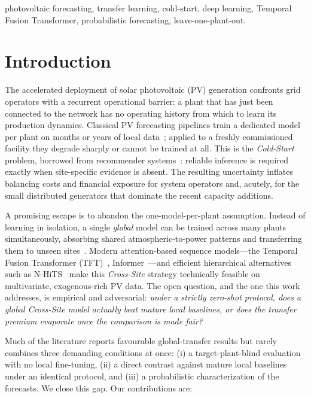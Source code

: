 \documentclass[conference]{IEEEtran}
\begin{document}
\begin{IEEEkeywords}
photovoltaic forecasting, transfer learning, cold-start, deep learning, Temporal Fusion
Transformer, probabilistic forecasting, leave-one-plant-out.
\end{IEEEkeywords}

\section{Introduction}
The accelerated deployment of solar photovoltaic (PV) generation confronts grid operators
with a recurrent operational barrier: a plant that has just been connected to the network
has no operating history from which to learn its production dynamics. Classical PV
forecasting pipelines train a dedicated model per plant on months or years of local
data~\cite{Antonanzas2016}; applied to a freshly commissioned facility they degrade sharply
or cannot be trained at all. This is the \emph{Cold-Start} problem, borrowed from
recommender systems~\cite{Schein2002}: reliable inference is required exactly when
site-specific evidence is absent. The resulting uncertainty inflates balancing costs and
financial exposure for system operators and, acutely, for the small distributed generators
that dominate the recent capacity additions.

A promising escape is to abandon the one-model-per-plant assumption. Instead of learning in
isolation, a single \emph{global} model can be trained across many plants simultaneously,
absorbing shared atmospheric-to-power patterns and transferring them to unseen
sites~\cite{MonteroManso2021,PanYang2010}. Modern attention-based sequence models---the
Temporal Fusion Transformer (TFT)~\cite{Lim2021}, Informer~\cite{Zhou2021}---and efficient
hierarchical alternatives such as N-HiTS~\cite{Challu2023} make this \emph{Cross-Site}
strategy technically feasible on multivariate, exogenous-rich PV data. The open question,
and the one this work addresses, is empirical and adversarial: \emph{under a strictly
zero-shot protocol, does a global Cross-Site model actually beat mature local baselines, or
does the transfer premium evaporate once the comparison is made fair?}

Much of the literature reports favourable global-transfer results but rarely combines three
demanding conditions at once: (i) a target-plant-blind evaluation with no local fine-tuning,
(ii) a direct contrast against mature local baselines under an identical protocol, and (iii)
a probabilistic characterization of the forecasts. We close this gap. Our contributions are:
\end{document}
